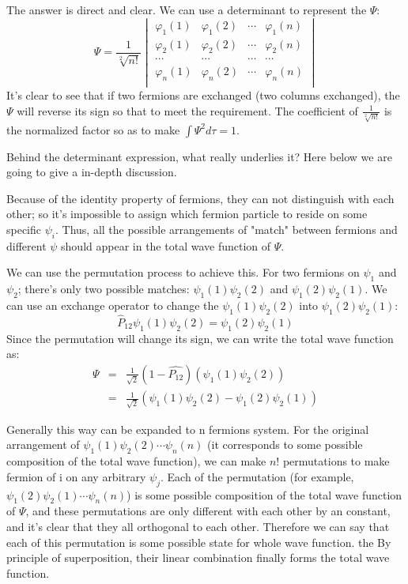 The answer is direct and clear. We can use a determinant to
represent the $\Psi$:
\begin{equation}\label{IDENTICALeq:4}
\Psi = \frac{1}{\sqrt[2]{n!}}\begin{vmatrix}
  \varphi_{1}(1) & \varphi_{1}(2) & \cdots & \varphi_{1}(n) \\
  \varphi_{2}(1) & \varphi_{2}(2) & \cdots & \varphi_{2}(n) \\
  \cdots & \cdots & \cdots & \cdots \\
  \varphi_{n}(1) & \varphi_{n}(2) & \cdots & \varphi_{n}(n) \\
\end{vmatrix}
\end{equation}
It's clear to see that if two fermions are exchanged (two columns
exchanged), the $\Psi$ will reverse its sign so that to meet the
requirement. The coefficient of $\frac{1}{\sqrt[2]{n!}}$ is the
normalized factor so as to make $\int \Psi^{2} d\tau =1$.

Behind the determinant expression, what really underlies it? Here
below we are going to give a in-depth discussion.

Because of the identity property of fermions, they can not
distinguish with each other; so it's impossible to assign which
fermion particle to reside on some specific $\psi_{i}$. Thus, all
the possible arrangements of "match" between fermions and different
$\psi$ should appear in the total wave function of $\Psi$.

We can use the permutation process to achieve this. For two fermions
on $\psi_{1}$ and $\psi_{2}$; there's only two possible matches:
$\psi_{1}(1)\psi_{2}(2)$ and $\psi_{1}(2)\psi_{2}(1)$. We can use an
exchange operator to change the $\psi_{1}(1)\psi_{2}(2)$ into
$\psi_{1}(2)\psi_{2}(1)$:
\begin{equation}\label{IDENTICALeq:5}
\hat{P}_{12}\psi_{1}(1)\psi_{2}(2) = \psi_{1}(2)\psi_{2}(1)
\end{equation}
Since the permutation will change its sign, we can write the total
wave function as:
\begin{eqnarray}
  \Psi &=& \frac{1}{\sqrt{2}}(1-\hat{P_{12}})(\psi_{1}(1)\psi_{2}(2)) \nonumber\\
       &=& \frac{1}{\sqrt{2}}(\psi_{1}(1)\psi_{2}(2)-\psi_{1}(2)\psi_{2}(1))
\end{eqnarray}

Generally this way can be expanded to n fermions system. For the
original arrangement of $\psi_{1}(1)\psi_{2}(2)\cdots\psi_{n}(n)$
(it corresponds to some possible composition of the total wave
function), we can make $n!$ permutations to make fermion of i on any
arbitrary $\psi_{j}$. Each of the permutation (for example,
$\psi_{1}(2)\psi_{2}(1)\cdots\psi_{n}(n)$) is some possible
composition of the total wave function of $\Psi$, and these
permutations are only different with each other by an constant, and
it's clear that they all orthogonal to each other. Therefore we can
say that each of this permutation is some possible state for whole
wave function. the By principle of superposition, their linear
combination finally forms the total wave function.

